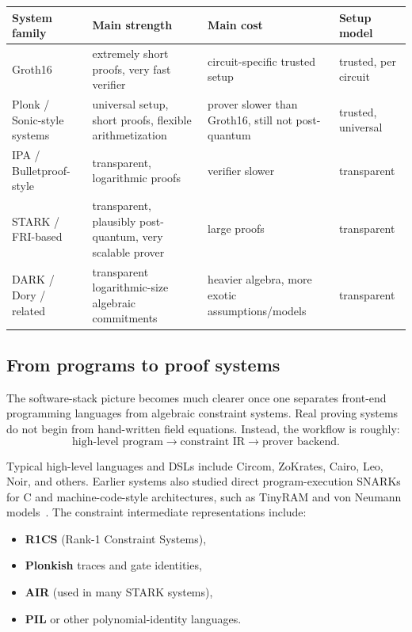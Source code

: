 \begin{center}
\begin{tabular}{>{\raggedright\arraybackslash}p{2.3cm} >{\raggedright\arraybackslash}p{2.9cm} >{\raggedright\arraybackslash}p{3.0cm} >{\raggedright\arraybackslash}p{3.0cm}}
\toprule
System family & Main strength & Main cost & Setup model \\
\midrule
Groth16 \cite{Groth2016} & extremely short proofs, very fast verifier & circuit-specific trusted setup & trusted, per circuit \\
Plonk / Sonic-style systems \cite{GabizonWilliamsonCiobotaru2019,MallerBoweKohlweissMeiklejohn2019} & universal setup, short proofs, flexible arithmetization & prover slower than Groth16, still not post-quantum & trusted, universal \\
IPA / Bulletproof-style \cite{Bulletproofs2018} & transparent, logarithmic proofs & verifier slower & transparent \\
STARK / FRI-based \cite{BenSassonBentovHoreshRiabzev2018STARK,BenSassonBentovHoreshRiabzev2018FRI} & transparent, plausibly post-quantum, very scalable prover & large proofs & transparent \\
DARK / Dory / related \cite{Lee2021Dory,BunzFischSzepieniec2020DARK} & transparent logarithmic-size algebraic commitments & heavier algebra, more exotic assumptions/models & transparent \\
\bottomrule
\end{tabular}
\end{center}

\subsection{From programs to proof systems}

The software-stack picture becomes much clearer once one separates front-end programming languages from algebraic constraint systems. Real proving systems do not begin from hand-written field equations. Instead, the workflow is roughly:
\[
\text{high-level program} \longrightarrow \text{constraint IR} \longrightarrow \text{prover backend}.
\]

Typical high-level languages and DSLs include Circom, ZoKrates, Cairo, Leo, Noir, and others. Earlier systems also studied direct program-execution SNARKs for C and machine-code-style architectures, such as TinyRAM and von Neumann models~\cite{BenSassonChiesaGenkinTromerVirza2013,BenSassonChiesaTromerVirza2014}. The constraint intermediate representations include:
\begin{itemize}[leftmargin=2em]
    \item \textbf{R1CS} (Rank-1 Constraint Systems),
    \item \textbf{Plonkish} traces and gate identities,
    \item \textbf{AIR} (used in many STARK systems),
    \item \textbf{PIL} or other polynomial-identity languages.
\end{itemize}

